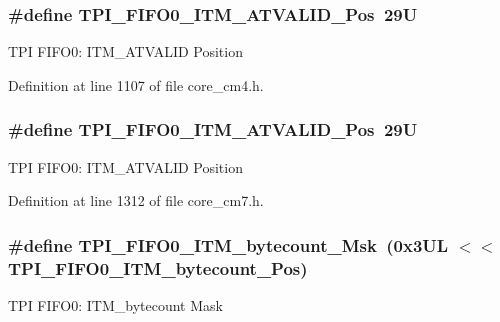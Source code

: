 \subsubsection[{\texorpdfstring{T\+P\+I\+\_\+\+F\+I\+F\+O0\+\_\+\+I\+T\+M\+\_\+\+A\+T\+V\+A\+L\+I\+D\+\_\+\+Pos}{TPI_FIFO0_ITM_ATVALID_Pos}}]{\setlength{\rightskip}{0pt plus 5cm}\#define T\+P\+I\+\_\+\+F\+I\+F\+O0\+\_\+\+I\+T\+M\+\_\+\+A\+T\+V\+A\+L\+I\+D\+\_\+\+Pos~29U}\hypertarget{group___c_m_s_i_s___t_p_i_gaa7e050e9eb6528241ebc6835783b6bae}{}\label{group___c_m_s_i_s___t_p_i_gaa7e050e9eb6528241ebc6835783b6bae}
T\+PI F\+I\+F\+O0\+: I\+T\+M\+\_\+\+A\+T\+V\+A\+L\+ID Position 

Definition at line 1107 of file core\+\_\+cm4.\+h.

\subsubsection[{\texorpdfstring{T\+P\+I\+\_\+\+F\+I\+F\+O0\+\_\+\+I\+T\+M\+\_\+\+A\+T\+V\+A\+L\+I\+D\+\_\+\+Pos}{TPI_FIFO0_ITM_ATVALID_Pos}}]{\setlength{\rightskip}{0pt plus 5cm}\#define T\+P\+I\+\_\+\+F\+I\+F\+O0\+\_\+\+I\+T\+M\+\_\+\+A\+T\+V\+A\+L\+I\+D\+\_\+\+Pos~29U}\hypertarget{group___c_m_s_i_s___t_p_i_gaa7e050e9eb6528241ebc6835783b6bae}{}\label{group___c_m_s_i_s___t_p_i_gaa7e050e9eb6528241ebc6835783b6bae}
T\+PI F\+I\+F\+O0\+: I\+T\+M\+\_\+\+A\+T\+V\+A\+L\+ID Position 

Definition at line 1312 of file core\+\_\+cm7.\+h.

\subsubsection[{\texorpdfstring{T\+P\+I\+\_\+\+F\+I\+F\+O0\+\_\+\+I\+T\+M\+\_\+bytecount\+\_\+\+Msk}{TPI_FIFO0_ITM_bytecount_Msk}}]{\setlength{\rightskip}{0pt plus 5cm}\#define T\+P\+I\+\_\+\+F\+I\+F\+O0\+\_\+\+I\+T\+M\+\_\+bytecount\+\_\+\+Msk~(0x3\+U\+L $<$$<$ T\+P\+I\+\_\+\+F\+I\+F\+O0\+\_\+\+I\+T\+M\+\_\+bytecount\+\_\+\+Pos)}\hypertarget{group___c_m_s_i_s___t_p_i_ga07bafa971b8daf0d63b3f92b9ae7fa16}{}\label{group___c_m_s_i_s___t_p_i_ga07bafa971b8daf0d63b3f92b9ae7fa16}
T\+PI F\+I\+F\+O0\+: I\+T\+M\+\_\+bytecount Mask 


